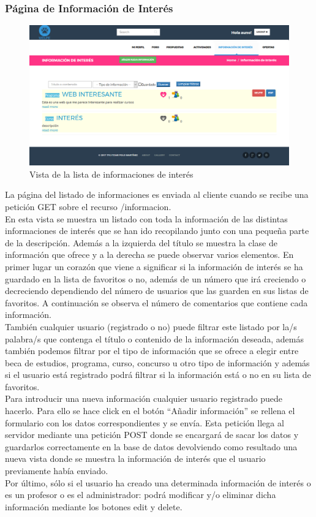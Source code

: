 \subsubsection{Página de Información de Interés}
\label{subsubsec:informaciones}
\begin{figure}[H]
\centering
\includegraphics[width=12cm]{img/infos_interes}
\caption{Vista de la lista de informaciones de interés}
\label{figura:infos_interes}
\end{figure}
La página del listado de informaciones es enviada al cliente cuando se recibe una petición GET sobre el recurso /informacion.\\
En esta vista se muestra un listado con toda la información de las distintas informaciones de interés que se han ido recopilando junto con una pequeña parte de la descripción. Además a la izquierda del título se muestra la clase de información que ofrece y a la derecha se puede observar varios elementos. En primer lugar un corazón que viene a significar si la información de interés se ha guardado en la lista de favoritos o no, además de un número que irá creciendo o decreciendo dependiendo del número de usuarios que las guarden en sus listas de favoritos. A continuación se observa el número de comentarios que contiene cada información.\\
También cualquier usuario (registrado o no) puede filtrar este listado por la/s palabra/s que contenga el título o contenido de la información deseada, además también podemos filtrar por el tipo de información que se ofrece a elegir entre beca de estudios, programa, curso, concurso u otro tipo de información y además si el usuario está registrado podrá filtrar si la información está o no en su lista de favoritos.\\
Para introducir una nueva información cualquier usuario registrado puede hacerlo. Para ello se hace click en el botón “Añadir información” se rellena el formulario con los datos correspondientes y se envía. Esta petición llega al servidor mediante una petición POST donde se encargará de sacar los datos y guardarlos correctamente en la base de datos devolviendo como resultado una nueva vista donde se muestra la información de interés que el usuario previamente había enviado.\\
Por último, sólo si el usuario ha creado una determinada información de interés o es un profesor o es el administrador: podrá modificar y/o eliminar dicha información mediante los botones edit y delete.

